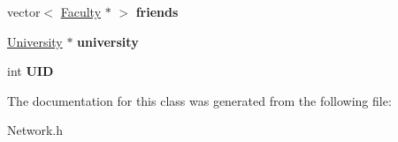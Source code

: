 \begin{DoxyCompactItemize}
\item 
\hypertarget{classFaculty_a9fd3a93bded480c5745142d276ff9e1d}{vector$<$ \hyperlink{classFaculty}{\-Faculty} $\ast$ $>$ {\bfseries friends}}\label{classFaculty_a9fd3a93bded480c5745142d276ff9e1d}

\item 
\hypertarget{classFaculty_a425b767fe263b1ddca8faebcb3197c18}{\hyperlink{classUniversity}{\-University} $\ast$ {\bfseries university}}\label{classFaculty_a425b767fe263b1ddca8faebcb3197c18}

\item 
\hypertarget{classFaculty_aeb6d3179fd233d2f19d3316ea73289f2}{int {\bfseries \-U\-I\-D}}\label{classFaculty_aeb6d3179fd233d2f19d3316ea73289f2}

\end{DoxyCompactItemize}


\-The documentation for this class was generated from the following file\-:\begin{DoxyCompactItemize}
\item 
\-Network.\-h\end{DoxyCompactItemize}
